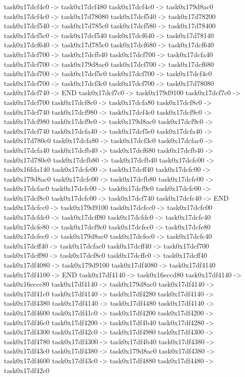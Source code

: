 {	task0x17dcf4c0 -> task0x17dcf480
	task0x17dcf4c0 -> task0x179d8ac0
	task0x17dcf4c0 -> task0x17d78080
	task0x17dcf540 -> task0x17d78200
	task0x17dcf540 -> task0x17d785c0
	task0x17dcf580 -> task0x17d78400
	task0x17dcf5c0 -> task0x17dcf540
	task0x17dcf640 -> task0x17d78140
	task0x17dcf640 -> task0x17d785c0
	task0x17dcf680 -> task0x17dcf640
	task0x17dcf700 -> task0x17dcfb40
	task0x17dcf700 -> task0x17dcfa40
	task0x17dcf700 -> task0x179d8ac0
	task0x17dcf700 -> task0x17dcf680
	task0x17dcf700 -> task0x17dcf5c0
	task0x17dcf700 -> task0x17dcf4c0
	task0x17dcf700 -> task0x17dcf3c0
	task0x17dcf700 -> task0x17d78080
	task0x17dcf740 -> END
	task0x17dcf7c0 -> task0x179d9100
	task0x17dcf7c0 -> task0x17dcf700
	task0x17dcf8c0 -> task0x17dcfa80
	task0x17dcf8c0 -> task0x17dcf740
	task0x17dcf980 -> task0x17dcf4c0
	task0x17dcf9c0 -> task0x17dcf980
	task0x17dcf9c0 -> task0x179d8ac0
	task0x17dcf9c0 -> task0x17dcf740
	task0x17dcfa40 -> task0x17dcf5c0
	task0x17dcfa40 -> task0x17d780c0
	task0x17dcfa80 -> task0x17dcf3c0
	task0x17dcfac0 -> task0x17dcfa40
	task0x17dcfb40 -> task0x17dcf680
	task0x17dcfb40 -> task0x17d780c0
	task0x17dcfb80 -> task0x17dcfb40
	task0x17dcfc00 -> task0x16fda140
	task0x17dcfc00 -> task0x17dcff40
	task0x17dcfc00 -> task0x179d8ac0
	task0x17dcfc00 -> task0x17dcfb80
	task0x17dcfc00 -> task0x17dcfac0
	task0x17dcfc00 -> task0x17dcf9c0
	task0x17dcfc00 -> task0x17dcf8c0
	task0x17dcfc00 -> task0x17dcf740
	task0x17dcfc40 -> END
	task0x17dcfcc0 -> task0x179d9100
	task0x17dcfcc0 -> task0x17dcfc00
	task0x17dcfdc0 -> task0x17dcff80
	task0x17dcfdc0 -> task0x17dcfc40
	task0x17dcfe80 -> task0x17dcf9c0
	task0x17dcfec0 -> task0x17dcfe80
	task0x17dcfec0 -> task0x179d8ac0
	task0x17dcfec0 -> task0x17dcfc40
	task0x17dcff40 -> task0x17dcfac0
	task0x17dcff40 -> task0x17dcf700
	task0x17dcff80 -> task0x17dcf8c0
	task0x17dcffc0 -> task0x17dcff40
	task0x17df4080 -> task0x179d9100
	task0x17df4080 -> task0x17df4140
	task0x17df4100 -> END
	task0x17df4140 -> task0x16eccd80
	task0x17df4140 -> task0x16eccc80
	task0x17df4140 -> task0x179d8ac0
	task0x17df4140 -> task0x17df41c0
	task0x17df4140 -> task0x17df4280
	task0x17df4140 -> task0x17df4380
	task0x17df4140 -> task0x17df4480
	task0x17df4140 -> task0x17df4600
	task0x17df41c0 -> task0x17df4200
	task0x17df4200 -> task0x17df46c0
	task0x17df4200 -> task0x17df4b40
	task0x17df4280 -> task0x17df4300
	task0x17df42c0 -> task0x17df4980
	task0x17df4300 -> task0x17df4780
	task0x17df4300 -> task0x17df4b40
	task0x17df4380 -> task0x17df43c0
	task0x17df4380 -> task0x179d8ac0
	task0x17df4380 -> task0x17df4600
	task0x17df43c0 -> task0x17df4880
	task0x17df4480 -> task0x17df42c0
}
